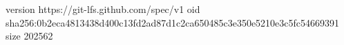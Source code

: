 version https://git-lfs.github.com/spec/v1
oid sha256:0b2eca4813438d400c13fd2ad87d1c2ca650485c3e350e5210e3c5fc54669391
size 202562
